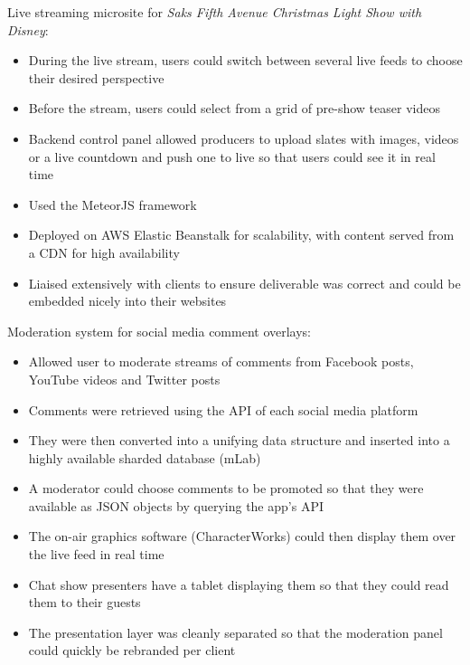 \item Live streaming microsite for \emph{Saks Fifth Avenue Christmas Light Show with Disney}:
\begin{itemize}%
    \item During the live stream, users could switch between several live feeds to choose their desired perspective
    \item Before the stream, users could select from a grid of pre-show teaser videos
    \item Backend control panel allowed producers to upload slates with images, videos or a live countdown and push one to live so that users could see it in real time
    \item Used the MeteorJS framework
    \item Deployed on AWS Elastic Beanstalk for scalability, with content served from a CDN for high availability
    \item Liaised extensively with clients to ensure deliverable was correct and could be embedded nicely into their websites
\end{itemize}
\bigbreak
\item Moderation system for social media comment overlays:
\begin{itemize}
    \item Allowed user to moderate streams of comments from Facebook posts, YouTube videos and Twitter posts
    \item Comments were retrieved using the API of each social media platform
    \item They were then converted into a unifying data structure and inserted into a highly available sharded database (mLab)
    \item A moderator could choose comments to be promoted so that they were available as JSON objects by querying the app's API
    \item The on-air graphics software (CharacterWorks) could then display them over the live feed in real time
    \item Chat show presenters have a tablet displaying them so that they could read them to their guests
    \item The presentation layer was cleanly separated so that the moderation panel could quickly be rebranded per client
\end{itemize}
\bigbreak
